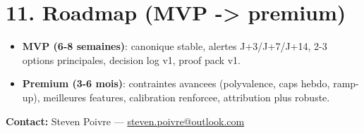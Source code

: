 \documentclass[11pt,a4paper]{article}
\begin{document}
\section*{11. Roadmap (MVP -> premium)}
\begin{itemize}
  \item \textbf{MVP (6-8 semaines)}: canonique stable, alertes J+3/J+7/J+14, 2-3 options principales, decision log v1, proof pack v1.
  \item \textbf{Premium (3-6 mois)}: contraintes avancees (polyvalence, caps hebdo, ramp-up), meilleures features, calibration renforcee, attribution plus robuste.
\end{itemize}

\vspace{2mm}
\noindent \textbf{Contact:} Steven Poivre --- \href{mailto:steven.poivre@outlook.com}{steven.poivre@outlook.com}
\end{document}
